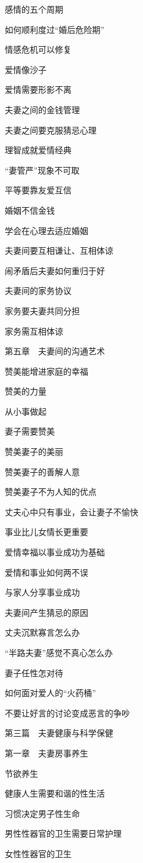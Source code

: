 \documentclass[12pt,UTF8]{ctexbook}
\begin{document}
感情的五个周期

如何顺利度过“婚后危险期”

情感危机可以修复

爱情像沙子

爱情需要形影不离

夫妻之间的金钱管理

夫妻之间要克服猜忌心理

理智成就爱情经典

“妻管严”现象不可取

平等要靠友爱互信

婚姻不信金钱

学会在心理去适应婚姻

夫妻间要互相谦让、互相体谅

闹矛盾后夫妻如何重归于好

夫妻间的家务协议

家务要夫妻共同分担

家务需互相体谅

第五章　夫妻间的沟通艺术

赞美能增进家庭的幸福

赞美的力量

从小事做起

妻子需要赞美

赞美妻子的美丽

赞美妻子的善解人意

赞美妻子不为人知的优点

丈夫心中只有事业，会让妻子不愉快

事业比儿女情长更重要

爱情幸福以事业成功为基础

爱情和事业如何两不误

与家人分享事业成功

夫妻间产生猜忌的原因

丈夫沉默寡言怎么办

“半路夫妻”感觉不真心怎么办

妻子任性怎对待

如何面对爱人的“火药桶”

不要让好言的讨论变成恶言的争吵

第三篇　夫妻健康与科学保健

第一章　夫妻房事养生

节欲养生

健康人生需要和谐的性生活

习惯决定男子性生命

男性性器官的卫生需要日常护理

女性性器官的卫生
\end{document}
